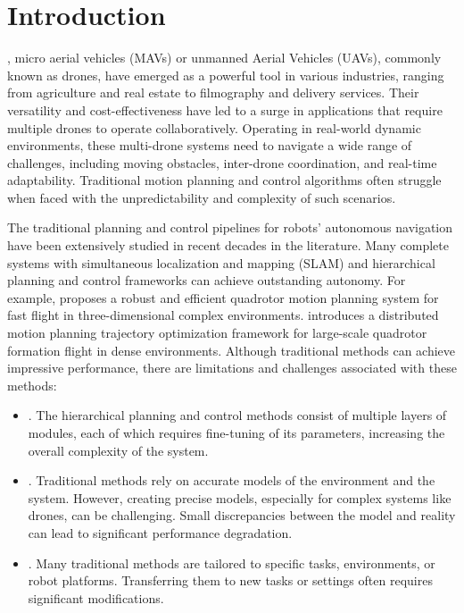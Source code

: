 \documentclass[letterpaper,journal,twoside]{IEEEtran}
\begin{document}
\section{Introduction}
, micro aerial vehicles (MAVs) or 
unmanned Aerial Vehicles (UAVs), commonly known as drones, 
have emerged as a powerful tool in various industries, 
ranging from agriculture and real estate to filmography and delivery 
services. 
Their versatility and cost-effectiveness have led to a 
surge in applications that require multiple drones to operate 
collaboratively. 
Operating in real-world dynamic environments, 
these multi-drone systems need to navigate a wide range of 
challenges, 
including moving obstacles, inter-drone coordination, and 
real-time adaptability. 
Traditional motion planning and control algorithms often  
struggle when faced with the unpredictability and complexity of such 
scenarios.

The traditional planning and control pipelines for robots' 
autonomous navigation have been extensively studied in recent
decades in the literature. 
Many complete systems with simultaneous localization 
and mapping (SLAM) and hierarchical 
planning and control frameworks can achieve outstanding 
autonomy.
For example, \cite{zhou2019robust} proposes a robust and efficient 
quadrotor motion planning system for fast flight in 
three-dimensional complex environments.
\cite{quan2023robust} introduces a distributed motion planning 
trajectory optimization framework for large-scale quadrotor 
formation flight in dense environments.
Although traditional methods can achieve impressive performance, 
there are limitations and challenges associated with these methods: 
\begin{itemize}
  \item {}. The hierarchical planning and control 
  methods consist of multiple layers of modules,   
  each of which requires fine-tuning of 
  its parameters, increasing the overall complexity of the system.
  \item {}. Traditional methods rely on 
  accurate models of the environment and the system. However, 
  creating precise models, especially for complex systems like 
  drones, can be challenging. Small discrepancies between the 
  model and reality can lead to significant performance 
  degradation. 
  \item {}. Many traditional methods are 
  tailored to specific tasks, environments, 
  or robot platforms. Transferring them 
  to new tasks or settings often requires significant 
  modifications. 
\end{itemize}
\end{document}
